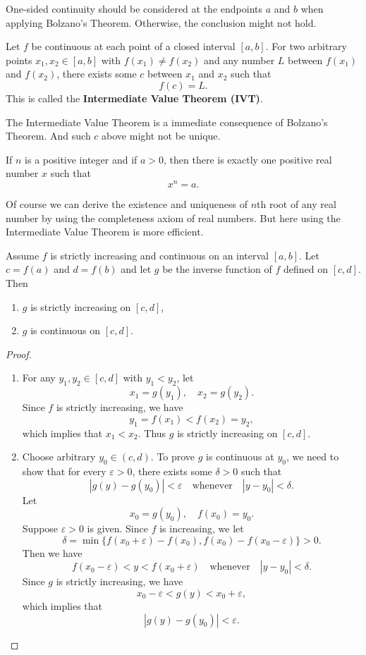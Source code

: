 \documentclass[a4paper]{ctexart}
\begin{document}
	\begin{myrmk}
		One-sided continuity should be considered at the endpoints $a$ and $b$ when applying Bolzano's Theorem. Otherwise, the conclusion might not hold.
	\end{myrmk}
	\begin{mythm}
		Let $f$ be continuous at each point of a closed interval $[a,b]$. For two arbitrary points $x_1,x_2\in[a,b]$ with $f(x_1)\neq f(x_2)$ and any number $L$ between $f(x_1)$ and $f(x_2)$, there exists some $c$ between $x_1$ and $x_2$ such that
		\[
		f(c)=L.
		\]
		This is called the \textbf{Intermediate Value Theorem (IVT)}.
	\end{mythm}
	\begin{myrmk}
		The Intermediate Value Theorem is a immediate consequence of Bolzano's Theorem. And such $c$ above might not be unique.
	\end{myrmk}
	\begin{mypro}
		If $n$ is a positive integer and if $a>0$, then there is exactly one positive real number $x$ such that
		\[
		x^n = a.
		\]
	\end{mypro}
	\begin{myrmk}
		Of course we can derive the existence and uniqueness of $n$th root of any real number by using the completeness axiom of real numbers. But here using the Intermediate Value Theorem is more efficient.
	\end{myrmk}
	\begin{mythm}
		Assume $f$ is strictly increasing and continuous on an interval $[a,b]$. Let $c=f(a)$ and $d=f(b)$ and let $g$ be the inverse function of $f$ defined on $[c,d]$. Then
		\begin{enumerate}
			\item $g$ is strictly increasing on $[c,d]$,
			\item $g$ is continuous on $[c,d]$.
		\end{enumerate}
	\end{mythm}
	\begin{proof}
		\begin{enumerate}
			\item For any $y_1,y_2\in [c,d]$ with $y_1<y_2$, let
			\[
			x_1=g(y_1),\quad x_2=g(y_2).
			\]
			Since $f$ is strictly increasing, we have
			\[
			y_1=f(x_1)<f(x_2)=y_2,
			\]
			which implies that $x_1<x_2$. Thus $g$ is strictly increasing on $[c,d]$.
			\item Choose arbitrary $y_0\in (c,d)$. To prove $g$ is continuous at $y_0$, we need to show that for every $\varepsilon>0$, there exists some $\delta>0$ such that
			\[
			|g(y)-g(y_0)|<\varepsilon\quad \text{whenever}\quad |y-y_0|<\delta.
			\]
			Let 
			\[
			x_0=g(y_0),\quad f(x_0)=y_0.
			\]
			Suppose $\varepsilon>0$ is given. Since $f$ is increasing, we let \[\delta=\min\{f(x_0+\varepsilon)-f(x_0), f(x_0)-f(x_0-\varepsilon)\}>0.\] Then we have
			\[
			f(x_0 - \varepsilon) < y < f(x_0 + \varepsilon) \quad \text{whenever}\quad |y-y_0|<\delta.
			\]
			Since $g$ is strictly increasing, we have
			\[
			x_0 - \varepsilon < g(y) < x_0 + \varepsilon,
			\]
			which implies that
			\[
			|g(y)-g(y_0)|<\varepsilon.
			\]

		\end{enumerate}
	\end{proof}
\end{document}
